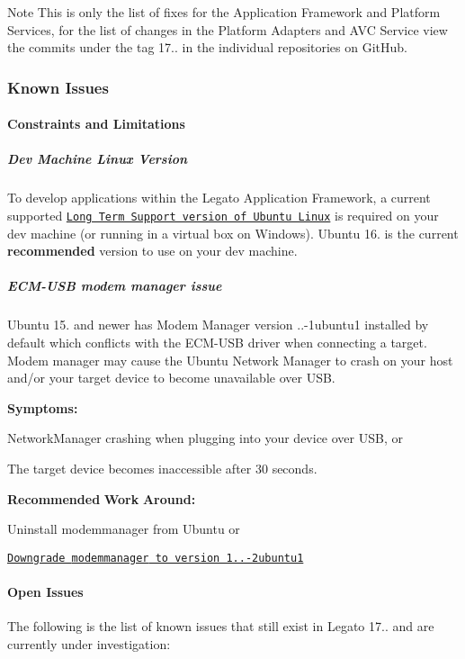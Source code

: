\begin{DoxyNote}{Note}
This is only the list of fixes for the Application Framework and Platform Services, for the list of changes in the Platform Adapters and A\+VC Service view the commits under the tag 17.. in the individual repositories on Git\+Hub.
\end{DoxyNote}
\hypertarget{releaseNotes17110_rn1711_KnownIssues}{}\subsubsection{Known Issues}\label{releaseNotes17110_rn1711_KnownIssues}
\hypertarget{releaseNotes17110_rn1711_Constraints}{}\paragraph{Constraints and Limitations}\label{releaseNotes17110_rn1711_Constraints}
\hypertarget{releaseNotes17110_rn1711_ContraintsLinuxSupport}{}\subparagraph{Dev Machine Linux Version}\label{releaseNotes17110_rn1711_ContraintsLinuxSupport}
To develop applications within the Legato Application Framework, a current supported \href{https://www.ubuntu.com/info/release-end-of-life}{\tt Long Term Support version of Ubuntu Linux} is required on your dev machine (or running in a virtual box on Windows). Ubuntu 16. is the current {\bfseries recommended} version to use on your dev machine.\hypertarget{releaseNotes17110_rn1711_ConstECMUSB}{}\subparagraph{E\+C\+M-\/\+U\+S\+B modem manager issue}\label{releaseNotes17110_rn1711_ConstECMUSB}
Ubuntu 15. and newer has Modem Manager version {..-\/1ubuntu1} installed by default which conflicts with the E\+C\+M-\/\+U\+SB driver when connecting a target. Modem manager may cause the Ubuntu Network Manager to crash on your host and/or your target device to become unavailable over U\+SB.

{\bfseries Symptoms\+:} 
\begin{DoxyItemize}
\item Network\+Manager crashing when plugging into your device over U\+SB, or
\item The target device becomes inaccessible after 30 seconds.
\end{DoxyItemize}

{\bfseries Recommended} {\bfseries Work} {\bfseries Around\+:} 
\begin{DoxyItemize}
\item Uninstall {\ttfamily modemmanager} from Ubuntu or
\item \href{http://packages.ubuntu.com/trusty/modemmanager}{\tt Downgrade {\ttfamily modemmanager} to version 1..-\/2ubuntu1}
\end{DoxyItemize}\hypertarget{releaseNotes17110_rn1711_OpenIssues}{}\paragraph{Open Issues}\label{releaseNotes17110_rn1711_OpenIssues}
The following is the list of known issues that still exist in Legato 17.. and are currently under investigation\+:

